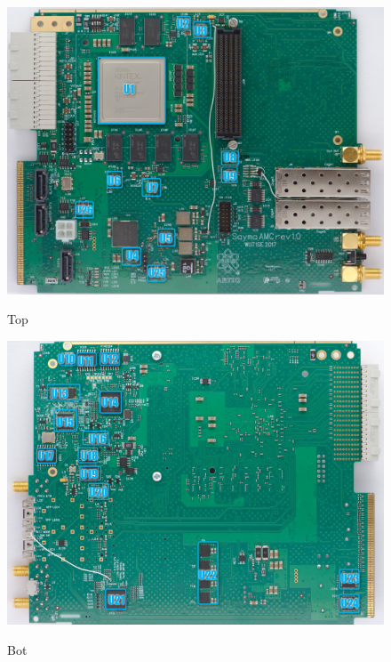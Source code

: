 		\begin{figure}[htbp!]
			\centering
			\includegraphics[width=14cm]{img/TU1.png}\\
			\caption{Top}
		\end{figure}
		\begin{figure}[htbp!]
			\centering
			\includegraphics[width=14cm]{img/BU1.png}\\
			\caption{Bot}
		\end{figure}
\clearpage

